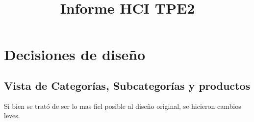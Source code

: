 \documentclass[english]{article}
\begin{document}
\title{Informe HCI TPE2}

\maketitle

\section{Decisiones de diseño}


\subsection*{Vista de Categorías, Subcategorías y productos }

Si bien se trató de ser lo mas fiel posible al diseño original, se
hicieron cambios leves.
\end{document}
